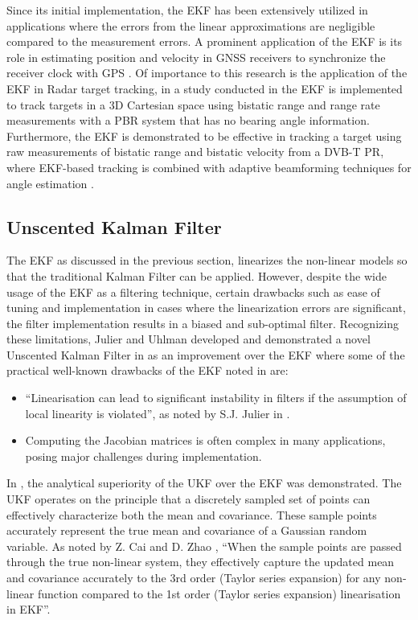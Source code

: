 Since its initial implementation, the \ac{EKF} has been extensively utilized in applications where the errors from the linear approximations are negligible compared to the measurement errors. A prominent application of the \ac{EKF} is its role in estimating position and velocity in \ac{GNSS} receivers to synchronize the receiver clock with \ac{GPS} \cite{Grewal2006}. Of importance to this research is the application of the \ac{EKF} in \ac{Radar} target tracking, in a study conducted in \cite{Measurements2023b} the \ac{EKF} is implemented to track targets in a \ac{3D} Cartesian space using bistatic range and range rate measurements with a \ac{PBR} system that has no bearing angle information. Furthermore, the \ac{EKF} is demonstrated to be effective in tracking a target using raw measurements of bistatic range and bistatic velocity from a \ac{DVB-T} \ac{PR}, where \ac{EKF}-based tracking is combined with adaptive beamforming techniques for angle estimation \cite{Pasculli2013}.

\subsection{Unscented Kalman Filter}
 The \ac{EKF} as discussed in the previous section, linearizes the non-linear models so that the traditional Kalman Filter can be applied. However, despite the wide usage of the \ac{EKF} as a filtering technique, certain drawbacks such as ease of tuning and implementation in cases where the linearization errors are significant, the filter implementation results in a biased and sub-optimal filter. Recognizing these limitations, Julier and Uhlman developed and demonstrated a novel Unscented Kalman Filter in \cite{Julier1997a} as an improvement over the \ac{EKF} where some of the practical well-known drawbacks of the \ac{EKF} noted in \cite{Julier1997a} are:
\begin{itemize}
    \item \textquotedblleft Linearisation can lead to significant instability in filters if the assumption of local linearity is violated\textquotedblright, as noted by S.J. Julier in \cite{Julier1997a}.
    \item Computing the Jacobian matrices is often complex in many applications, posing major challenges during implementation.
\end{itemize}
In \cite{Julier1997a}, the analytical superiority of the \ac{UKF} over the \ac{EKF} was demonstrated. The \ac{UKF} operates on the principle that a discretely sampled set of points can effectively characterize both the mean and covariance. These sample points accurately represent the true mean and covariance of a Gaussian random variable. As noted by Z. Cai and D. Zhao \cite{Cai2006},  \textquotedblleft When the sample points are passed through the true non-linear system, they effectively capture the updated mean and covariance accurately to the 3rd order (Taylor series expansion) for any non-linear function compared to the 1st order (Taylor series expansion) linearisation in \ac{EKF}\textquotedblright.

